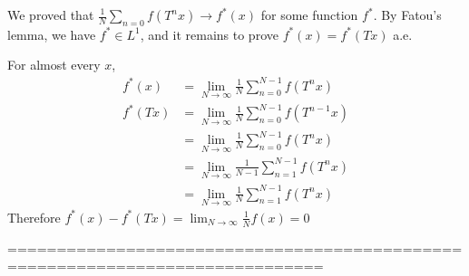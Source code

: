\documentclass[10pt,a4paper]{report}
\newenvironment{proof}
{\begin{changemargin}{1cm}{0.5cm} 
	}%
	{\end{changemargin}
}
\begin{document}
\begin{proof}
\quad We proved that $\frac{1}{N} \sum_{n=0} f(T^n x) \rightarrow f^*(x)$ for some function $f^*$. By Fatou's lemma, we have $f^* \in L^1$, and it remains to prove $f^*(x) = f^*(Tx)$ a.e.

\quad For almost every $x$,
\begin{align*}
f^*(x) &= \lim_{N\rightarrow \infty} \frac{1}{N} \sum_{n=0}^{N-1}f(T^n x) \\
f^*(Tx) &= \lim_{N\rightarrow \infty} \frac{1}{N} \sum_{n=0}^{N-1} f(T^{n-1} x) \\
&= \lim_{N\rightarrow \infty} \frac{1}{N} \sum_{n=0}^{N-1} f(T^n x) \\
&= \lim_{N\rightarrow \infty} \frac{1}{N-1} \sum_{n=1}^{N-1} f(T^n x) \\
&= \lim_{N\rightarrow \infty} \frac{1}{N} \sum_{n=1}^{N-1} f(T^n x)
\end{align*}
Therefore $f^*(x) - f^*(Tx) = \lim_{N\rightarrow \infty} \frac{1}{N}f(x) = 0$ 

\eop
\end{proof}

==============================================================================
\end{document}

